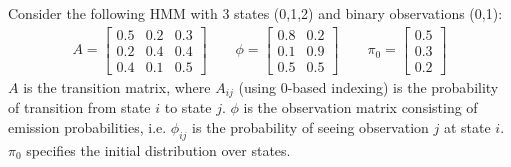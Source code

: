 \documentclass{abernethy_hw}
\begin{document}
Consider the following HMM with 3 states (0,1,2) and binary observations (0,1):
\begin{align*}
A = \begin{bmatrix}
0.5 & 0.2 & 0.3 \\
0.2 & 0.4 & 0.4 \\
0.4 & 0.1 & 0.5
\end{bmatrix} \qquad
\phi = \begin{bmatrix}
0.8 & 0.2 \\
0.1 & 0.9 \\
0.5 & 0.5
\end{bmatrix} \qquad
\pi_0 = \begin{bmatrix}
0.5\\
0.3\\
0.2
\end{bmatrix}
\end{align*}
$A$ is the transition matrix, where $A_{ij}$ (using 0-based indexing) is the probability of transition from state $i$ to state $j$. $\phi$ is the observation matrix consisting of emission probabilities, i.e. $\phi_{ij}$ is the probability of seeing observation $j$ at state $i$. $\pi_0$ specifies the initial distribution over states.
\end{document}
